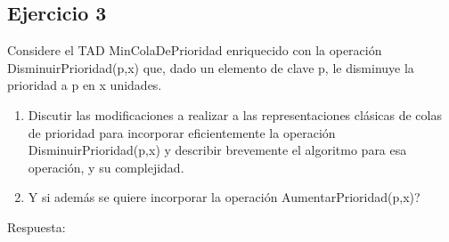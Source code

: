 \documentclass[10pt, a4paper]{report}
\begin{document}
\subsection*{Ejercicio 3}
Considere el TAD MinColaDePrioridad enriquecido con la operaci\'on DisminuirPrioridad(p,x) que, dado un elemento de clave p, le disminuye la prioridad a p en x unidades.

\begin{enumerate}
 \item Discutir las modificaciones a realizar a las representaciones cl\'asicas de colas de prioridad para incorporar eficientemente la operaci\'on DisminuirPrioridad(p,x) y describir brevemente el algoritmo para esa operaci\'on, y su complejidad.

 \item Y si adem\'as se quiere incorporar la operaci\'on AumentarPrioridad(p,x)?
\end{enumerate}

Respuesta:
\end{document}
